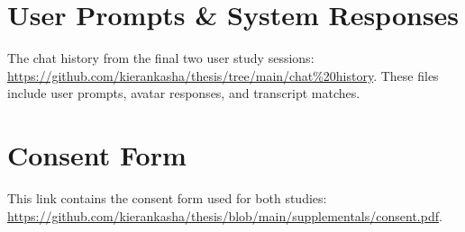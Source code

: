 \documentclass[12pt]{report}
\newcommand\blankpage{%
    \null
    \thispagestyle{empty}%
    \addtocounter{page}{-1}%
    \newpage}
\begin{document}
\begin{myfont}
        \chapter{User Prompts \& System Responses}
        \label{app:K}
        The chat history from the final two user study sessions: \url{https://github.com/kierankasha/thesis/tree/main/chat%20history}. These files include user prompts, avatar responses, and transcript matches.
        
        \chapter{Consent Form}
        \label{app:L}
        This link contains the consent form used for both studies: \url{https://github.com/kierankasha/thesis/blob/main/supplementals/consent.pdf}.
        
    
    \end{myfont}
    \clearpage
    \blankpage
    \blankpage
\end{document}
